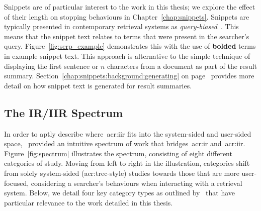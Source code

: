 Snippets are of particular interest to the work in this thesis; we explore the effect of their length on stopping behaviours in Chapter~\ref{chap:snippets}. Snippets are typically presented in contemporary retrieval systems as \emph{query-biased}~\citep{tombros1998query_biased}. This means that the snippet text relates to terms that were present in the searcher's query. Figure~\ref{fig:serp_example} demonstrates this with the use of \textbf{bolded} terms in example snippet text. This approach is alternative to the simple technique of displaying the first sentence or $n$ characters from a document as part of the result summary. Section~\ref{chap:snippets:background:generating} on page~\pageref{chap:snippets:background:generating} provides more detail on how snippet text is generated for result summaries.

\vspace*{-2mm}
\subsection{The IR/IIR Spectrum}\label{sec:ir_background:user:spectrum}
In order to aptly describe where~\gls{acr:iir} fits into the system-sided and user-sided space,~\cite{kelly2009iir} provided an intuitive spectrum of work that bridges~\gls{acr:ir} and~\gls{acr:iir}. Figure~\ref{fig:spectrum} illustrates the spectrum, consisting of eight different categories of study. Moving from left to right in the illustration, categories shift from solely system-sided (\gls{acr:trec}-style) studies towards those that are more user-focused, considering a searcher's behaviours when interacting with a retrieval system. Below, we detail four key category types as outlined by~\cite{kelly2009iir} that have particular relevance to the work detailed in this thesis.


